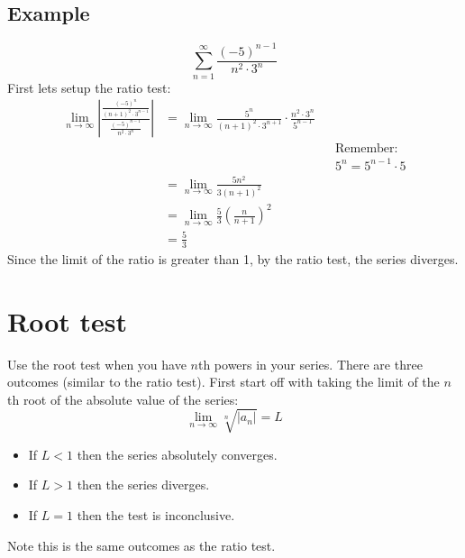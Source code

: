 \documentclass{article}
\begin{document}
    \subsection{Example}
        \[\sum_{n = 1}^{\infty} \frac{(-5)^{n-1}}{n^2 \cdot 3^n} \]
        First lets setup the ratio test:
        \begin{align*}
            \lim_{n \to \infty} \left| \frac{\frac{(-5)^n}{(n+1)^2 \cdot 3^{n-1}}}{\frac{(-5)^{n-1}}{n^2 \cdot 3^n}} \right|
            &= \lim_{n \to \infty} \frac{5^n}{(n+1)^2 \cdot 3^{n+1}} \cdot \frac{n^2 \cdot 3^n}{5^{n-1}} \\
            && &\text{Remember:} \\
            && & 5^n = 5^{n-1} \cdot 5 \\
            &= \lim_{n \to \infty} \frac{5n^2}{3(n+1)^2} \\
            &= \lim_{n \to \infty} \frac{5}{3} \left(\frac{n}{n+1}\right)^2 \\
            &= \frac{5}{3}
        \end{align*}
        Since the limit of the ratio is greater than 1, by the ratio test, the series diverges.

\section{Root test}
    Use the root test when you have \(n\)th powers in your series. There are three outcomes (similar to the ratio test).
    First start off with taking the limit of the \(n\)th root of the absolute value of the series:
    \[\lim_{n \to \infty} \sqrt[n]{\left| a_n \right|} = L\] 
    \begin{itemize}
        \item If \(L < 1\) then the series absolutely converges.
        \item If \(L > 1\) then the series diverges.
        \item If \(L = 1\) then the test is inconclusive.
    \end{itemize}
    Note this is the same outcomes as the ratio test.
    
\end{document}
